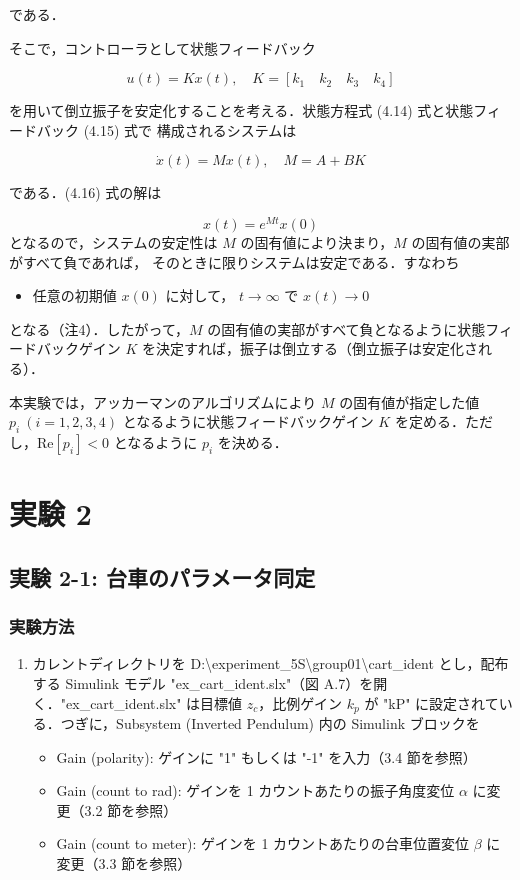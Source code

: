 である．

そこで，コントローラとして状態フィードバック

\[
  u(t) = Kx(t), \quad K = [k_1 \quad k_2 \quad k_3 \quad k_4] \tag{4.15}
\]

を用いて倒立振子を安定化することを考える．状態方程式 (4.14) 式と状態フィードバック (4.15) 式で
構成されるシステムは

\[
  \dot{x}(t) = Mx(t), \quad M = A + BK \tag{4.16}
\]

である．(4.16) 式の解は

\[
  x(t) = e^{Mt}x(0) \tag{4.17}
\]
となるので，システムの安定性は \( M \) の固有値により決まり，\( M \) の固有値の実部がすべて負であれば，
そのときに限りシステムは安定である．すなわち

\begin{itemize}
  \item 任意の初期値 \( x(0) \) に対して， \( t \to \infty \) で \( x(t) \to 0 \)
\end{itemize}

となる（注4）．したがって，\( M \) の固有値の実部がすべて負となるように状態フィードバックゲイン \( K \) 
を決定すれば，振子は倒立する（倒立振子は安定化される）．

本実験では，アッカーマンのアルゴリズムにより \( M \) の固有値が指定した値 \( p_i \ (i=1,2,3,4) \) 
となるように状態フィードバックゲイン \( K \) を定める．ただし，\( \text{Re}[p_i] < 0 \) となるように
\( p_i \) を決める．

\section{実験 2}
\subsection{実験 2-1: 台車のパラメータ同定}
\subsubsection{実験方法}

\begin{enumerate}
  \item カレントディレクトリを D:\textbackslash experiment\_5S\textbackslash group01\textbackslash cart\_ident とし，配布する Simulink モデル "ex\_cart\_ident.slx"（図 A.7）を開く．"ex\_cart\_ident.slx" は目標値 \( z_c \)，比例ゲイン \( k_p \) が "kP" に設定されている．つぎに，Subsystem (Inverted Pendulum) 内の Simulink ブロックを
        \begin{itemize}
          \item Gain (polarity): ゲインに "1" もしくは "-1" を入力（3.4 節を参照）
          \item Gain (count to rad): ゲインを 1 カウントあたりの振子角度変位 \( \alpha \) に変更（3.2 節を参照）
          \item Gain (count to meter): ゲインを 1 カウントあたりの台車位置変位 \( \beta \) に変更（3.3 節を参照）
        \end{itemize}
\end{enumerate}

